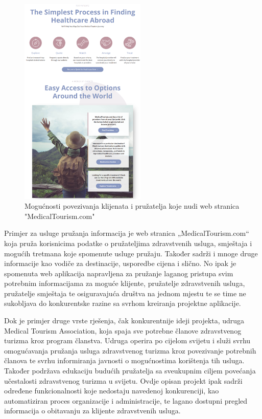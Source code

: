 		\break
		\begin{figure}
			\includegraphics[width=6cm]{slike/konkurencija.png} %
			\caption{Mogućnosti povezivanja klijenata i pružatelja koje nudi web stranica "MedicalTourism.com"}
			\label{fig:konkurencija}
			\centering
		\end{figure}
		
		Primjer za usluge pružanja informacija je web stranica „MedicalTourism.com“ koja pruža korisnicima podatke o pružateljima zdravstvenih usluga, smještaja i mogućih tretmana koje spomenute usluge pružaju. Također sadrži i mnoge druge informacije kao vodiče za destinacije, usporedbe cijena i slično. No ipak je spomenuta web aplikacija napravljena za pružanje laganog pristupa svim potrebnim informacijama za moguće klijente, pružatelje zdravstvenih usluga, pružatelje smještaja te osiguravajuća društva na jednom mjestu te se time ne sukobljava do konkurentske razine sa svrhom kreiranja projektne aplikacije.
		
		
		Dok je primjer druge vrste rješenja, čak konkurentnije ideji projekta, udruga Medical Tourism Association, koja spaja sve potrebne članove zdravstvenog turizma kroz program članstva. Udruga operira po cijelom svijetu i služi svrhu omogućavanja pružanja usluga zdravstvenog turizma kroz povezivanje potrebnih članova te svrhu informiranja javnosti o mogućnostima korištenja tih usluga. Također podržava edukaciju budućih pružatelja sa sveukupnim ciljem povećanja učestalosti zdravstvenog turizma u svijetu. Ovdje opisan projekt ipak sadrži određene funkcionalnosti koje nedostaju navedenoj konkurenciji, kao automatiziran proces organizacije i administracije, te lagano dostupni pregled informacija o obitavanju za klijente zdravstvenih usluga.
		
